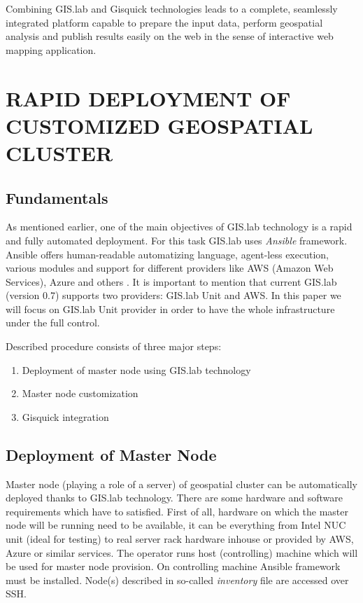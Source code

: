 \documentclass{isprs}
\begin{document}
Combining GIS.lab and Gisquick technologies leads to a complete, seamlessly
integrated platform capable to prepare the input data, perform geospatial
analysis and publish results easily on the web in the sense of interactive
web mapping application.

\section{RAPID DEPLOYMENT OF CUSTOMIZED GEOSPATIAL CLUSTER}

\subsection{Fundamentals}

As mentioned earlier, one of the main objectives of GIS.lab technology
is a rapid and fully automated deployment. For this task GIS.lab uses
\textit{Ansible} framework. Ansible offers human-readable automatizing
language, agent-less execution, various modules and support for
different providers like AWS (Amazon Web Services), Azure and others
\cite{hochstein2014ansible}. It is important to mention that current
GIS.lab (version 0.7) supports two providers: GIS.lab Unit and AWS. In
this paper we will focus on GIS.lab Unit provider in order to have the
whole infrastructure under the full control.

Described procedure consists of three major steps:

\begin{enumerate}
\setlength\itemsep{0em}\setlength\parskip{0em}\setlength\topsep{0em}\setlength\partopsep{0em}\setlength\parsep{0em}
\item{Deployment of master node using GIS.lab technology} 
\item{Master node customization}
\item{Gisquick integration}
\end{enumerate}

\subsection{Deployment of Master Node}\label{Deployment of Master Node}

Master node (playing a role of a server) of geospatial cluster can be
automatically deployed thanks to GIS.lab technology. There are some
hardware and software requirements which have to satisfied. First of
all, hardware on which the master node will be running need to be
available, it can be everything from Intel NUC unit (ideal for
testing) to real server rack hardware inhouse or provided by AWS,
Azure or similar services. The operator runs host (controlling)
machine which will be used for master node provision. On controlling
machine Ansible framework must be installed. Node(s) described in
so-called \textit{inventory} file are accessed over SSH.
\end{document}
